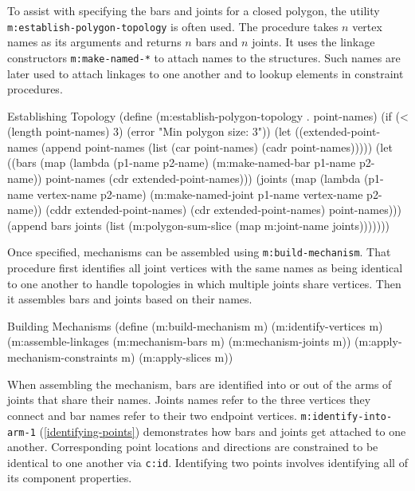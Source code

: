 To assist with specifying the bars and joints for a closed polygon,
the utility \texttt{m:establish-polygon-topology} is often used. The
procedure takes $n$ vertex names as its arguments and returns $n$ bars
and $n$ joints. It uses the linkage constructors
\texttt{m:make-named-*} to attach names to the structures.  Such names
are later used to attach linkages to one another and to lookup
elements in constraint procedures.

\begin{code-listing}
[label=est-topo]
{Establishing Topology}
(define (m:establish-polygon-topology . point-names)
  (if (< (length point-names) 3)
      (error "Min polygon size: 3"))
  (let ((extended-point-names
         (append point-names (list (car point-names) (cadr point-names)))))
    (let ((bars (map (lambda (p1-name p2-name)
                       (m:make-named-bar p1-name p2-name))
                     point-names (cdr extended-point-names)))
          (joints (map (lambda (p1-name vertex-name p2-name)
                         (m:make-named-joint p1-name vertex-name p2-name))
                       (cddr extended-point-names)
                       (cdr extended-point-names)
                       point-names)))
      (append bars joints
              (list (m:polygon-sum-slice (map m:joint-name joints)))))))
\end{code-listing}

Once specified, mechanisms can be assembled using
\texttt{m:build-mechanism}.  That procedure first identifies all joint
vertices with the same names as being identical to one another to
handle topologies in which multiple joints share vertices. Then it
assembles bars and joints based on their names.

\begin{code-listing}
{Building Mechanisms}
(define (m:build-mechanism m)
  (m:identify-vertices m)
  (m:assemble-linkages (m:mechanism-bars m)
                       (m:mechanism-joints m))
  (m:apply-mechanism-constraints m)
  (m:apply-slices m))
\end{code-listing}

When assembling the mechanism, bars are identified into or out of the
arms of joints that share their names. Joints names refer to the three
vertices they connect and bar names refer to their two endpoint
vertices.  \texttt{m:identify-into-arm-1} (\ref{identifying-points})
demonstrates how bars and joints get attached to one
another. Corresponding point locations and directions are constrained
to be identical to one another via \texttt{c:id}. Identifying two
points involves identifying all of its component properties.

